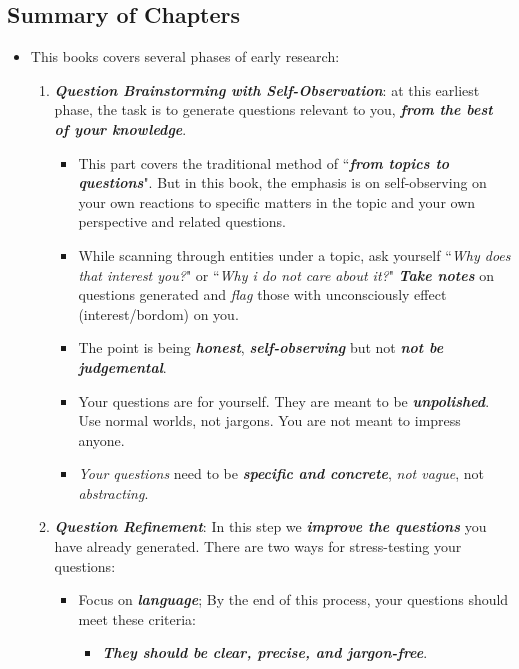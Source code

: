 \documentclass[11pt]{article}
\begin{document}
\subsection{Summary of Chapters}
\begin{itemize}
\item This books covers several phases of early research:
\begin{enumerate}
\item \emph{\textbf{Question Brainstorming with Self-Observation}}: at this earliest phase, the task is to generate questions relevant to you, \emph{\textbf{from the best of your knowledge}}. 

\begin{itemize}
\item This part covers the traditional method of ``\emph{\textbf{from topics to questions}}". But in this book, the emphasis is on self-observing on your own reactions to specific matters in the topic and your own perspective and related questions. 

\item While scanning through entities under a topic, ask yourself  ``\emph{Why does that interest you?}" or ``\emph{Why i do not care about it?}" \emph{\textbf{Take notes}} on questions generated and \emph{flag} those with unconsciously effect (interest/bordom) on you. 

\item The point is being \emph{\textbf{honest}}, \emph{\textbf{self-observing}} but not \emph{\textbf{not be judgemental}}. 


\item Your questions are for yourself. They are meant to be \emph{\textbf{unpolished}}. Use normal worlds, not jargons. You are not meant to impress anyone. 

\item \emph{Your questions} need to be \emph{\textbf{specific and concrete}}, \emph{not vague}, not \emph{abstracting}. 
\end{itemize}

\item  \emph{\textbf{Question Refinement}}: In this step we \emph{\textbf{improve the questions}} you have already generated. 
There are two ways for stress-testing your questions:
\begin{itemize}
\item Focus on \emph{\textbf{language}}; By the end of this process, your questions should meet these criteria:
\begin{itemize}
\item \textbf{\emph{They should be clear, precise, and jargon-free}}. 


\end{itemize}
\end{itemize}
\end{enumerate}
\end{itemize}
\end{document}
